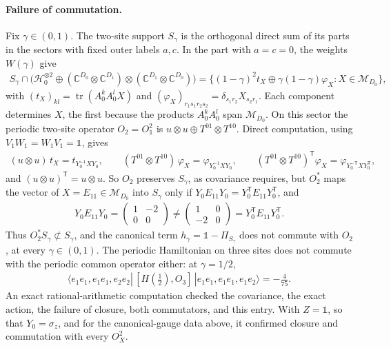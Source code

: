 \documentclass{article}
\begin{document}
\paragraph{Failure of commutation.} Fix $\gamma\in(0,1)$. The two-site
support $S_\gamma$ is the orthogonal direct sum of its parts in the
sectors with fixed outer labels $a,c$. In the part with $a=c=0$, the
weights $W(\gamma)$ give
\begin{align}
    S_\gamma\cap\bigl(\mathcal H_0^{\otimes2}\oplus
    (\mathbb C^{D_0}\otimes\mathbb C^{D_1})\otimes
    (\mathbb C^{D_1}\otimes\mathbb C^{D_0})\bigr)
    =\bigl\{(1-\gamma)^2t_X\oplus\gamma(1-\gamma)\varphi_X:
    X\in\mathcal M_{D_0}\bigr\},
    \label{eq:glm23_parent_commutation_support_sector}
\end{align}
with $(t_X)_{kl}=\operatorname{tr}(A_0^kA_0^lX)$ and
$(\varphi_X)_{r_1s_1r_2s_2}=\delta_{s_1r_2}X_{s_2r_1}$. Each component
determines $X$, the first because the products $A_0^kA_0^l$ span
$\mathcal M_{D_0}$. On this sector the periodic two-site operator
$O_2=O^2_{\mathbb 1}$ is $u\otimes u\oplus T^{01}\otimes T^{10}$. Direct
computation, using $V_1W_1=W_1V_1=\mathbb 1$, gives
\begin{align}
    (u\otimes u)\,t_X=t_{Y_0^{-1}XY_0},\qquad
    (T^{01}\otimes T^{10})\,\varphi_X=\varphi_{Y_0^{-1}XY_0},\qquad
    (T^{01}\otimes T^{10})^{\mathsf T}\varphi_X
    =\varphi_{Y_0^{-\mathsf T}XY_0^{\mathsf T}},
    \label{eq:glm23_parent_commutation_sector_covariance}
\end{align}
and $(u\otimes u)^{\mathsf T}=u\otimes u$. So $O_2$ preserves $S_\gamma$,
as covariance requires, but $O_2^*$ maps the vector of
$X=E_{11}\in\mathcal M_{D_0}$ into
$S_\gamma$ only if $Y_0E_{11}Y_0=Y_0^{\mathsf T}E_{11}Y_0^{\mathsf T}$,
and
\begin{align}
    Y_0E_{11}Y_0=\begin{pmatrix}1&-2\\0&0\end{pmatrix}\neq
    \begin{pmatrix}1&0\\-2&0\end{pmatrix}
    =Y_0^{\mathsf T}E_{11}Y_0^{\mathsf T}.
    \label{eq:glm23_parent_commutation_e11_comparison}
\end{align}
Thus $O_2^*S_\gamma\not\subset S_\gamma$, and the canonical term
$h_\gamma=\mathbb 1-\Pi_{S_\gamma}$ does not commute with $O_2$, at every
$\gamma\in(0,1)$. The periodic Hamiltonian on three sites does not
commute with the periodic common operator either: at $\gamma=1/2$,
\begin{align}
    \langle e_1e_1,e_1e_1,e_2e_2|\,[H(\tfrac12),O_3]\,|
    e_1e_1,e_1e_1,e_1e_2\rangle=-\tfrac{4}{75}.
    \label{eq:glm23_parent_commutation_three_site_commutator}
\end{align}
An exact rational-arithmetic computation checked the covariance, the
exact action, the failure of closure, both commutators, and this entry.
With $Z=\mathbb 1$, so that $Y_0=\sigma_z$, and for the canonical-gauge
data above, it confirmed closure and commutation with every $O^2_X$.
\end{document}
